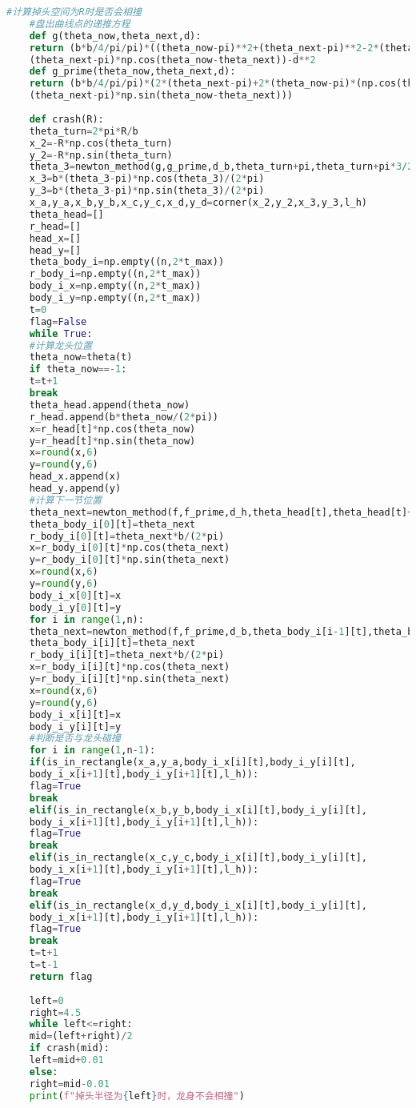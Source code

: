 \documentclass[withoutpreface,bwprint]{cumcmthesis} %
\begin{document}
\begin{lstlisting}[language=Python]
	#计算掉头空间为R时是否会相撞
	#盘出曲线点的递推方程
	def g(theta_now,theta_next,d):
	return (b*b/4/pi/pi)*((theta_now-pi)**2+(theta_next-pi)**2-2*(theta_now-pi)*
	(theta_next-pi)*np.cos(theta_now-theta_next))-d**2
	def g_prime(theta_now,theta_next,d):
	return (b*b/4/pi/pi)*(2*(theta_next-pi)+2*(theta_now-pi)*(np.cos(theta_now-theta_next)-
	(theta_next-pi)*np.sin(theta_now-theta_next)))
	
	def crash(R):
	theta_turn=2*pi*R/b
	x_2=-R*np.cos(theta_turn)
	y_2=-R*np.sin(theta_turn)
	theta_3=newton_method(g,g_prime,d_b,theta_turn+pi,theta_turn+pi*3/2)
	x_3=b*(theta_3-pi)*np.cos(theta_3)/(2*pi)
	y_3=b*(theta_3-pi)*np.sin(theta_3)/(2*pi)
	x_a,y_a,x_b,y_b,x_c,y_c,x_d,y_d=corner(x_2,y_2,x_3,y_3,l_h)
	theta_head=[]
	r_head=[]
	head_x=[]
	head_y=[]
	theta_body_i=np.empty((n,2*t_max))
	r_body_i=np.empty((n,2*t_max))
	body_i_x=np.empty((n,2*t_max))
	body_i_y=np.empty((n,2*t_max))
	t=0
	flag=False
	while True:
	#计算龙头位置
	theta_now=theta(t)
	if theta_now==-1:
	t=t+1
	break
	theta_head.append(theta_now)
	r_head.append(b*theta_now/(2*pi))
	x=r_head[t]*np.cos(theta_now)
	y=r_head[t]*np.sin(theta_now)
	x=round(x,6)
	y=round(y,6)
	head_x.append(x)
	head_y.append(y)
	#计算下一节位置
	theta_next=newton_method(f,f_prime,d_h,theta_head[t],theta_head[t]+pi/2)
	theta_body_i[0][t]=theta_next
	r_body_i[0][t]=theta_next*b/(2*pi)
	x=r_body_i[0][t]*np.cos(theta_next)
	y=r_body_i[0][t]*np.sin(theta_next)
	x=round(x,6)
	y=round(y,6)
	body_i_x[0][t]=x
	body_i_y[0][t]=y
	for i in range(1,n):
	theta_next=newton_method(f,f_prime,d_b,theta_body_i[i-1][t],theta_body_i[i-1][t]+pi/2)
	theta_body_i[i][t]=theta_next
	r_body_i[i][t]=theta_next*b/(2*pi)
	x=r_body_i[i][t]*np.cos(theta_next)
	y=r_body_i[i][t]*np.sin(theta_next)
	x=round(x,6)
	y=round(y,6)
	body_i_x[i][t]=x
	body_i_y[i][t]=y
	#判断是否与龙头碰撞
	for i in range(1,n-1):
	if(is_in_rectangle(x_a,y_a,body_i_x[i][t],body_i_y[i][t],
	body_i_x[i+1][t],body_i_y[i+1][t],l_h)):
	flag=True
	break
	elif(is_in_rectangle(x_b,y_b,body_i_x[i][t],body_i_y[i][t],
	body_i_x[i+1][t],body_i_y[i+1][t],l_h)):
	flag=True
	break
	elif(is_in_rectangle(x_c,y_c,body_i_x[i][t],body_i_y[i][t],
	body_i_x[i+1][t],body_i_y[i+1][t],l_h)):
	flag=True
	break
	elif(is_in_rectangle(x_d,y_d,body_i_x[i][t],body_i_y[i][t],
	body_i_x[i+1][t],body_i_y[i+1][t],l_h)):
	flag=True
	break
	t=t+1
	t=t-1
	return flag
	
	left=0
	right=4.5
	while left<=right:
	mid=(left+right)/2
	if crash(mid):
	left=mid+0.01
	else:
	right=mid-0.01
	print(f"掉头半径为{left}时，龙身不会相撞")
	

\end{lstlisting}
\end{document}
